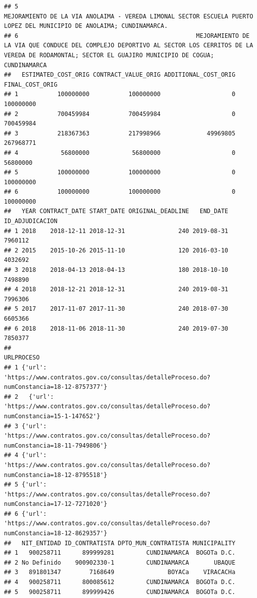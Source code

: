\documentclass[
]{article}
\begin{document}
\begin{verbatim}
## 5                                                                                            MEJORAMIENTO DE LA VIA ANOLAIMA - VEREDA LIMONAL SECTOR ESCUELA PUERTO LOPEZ DEL MUNICIPIO DE ANOLAIMA; CUNDINAMARCA.
## 6                                                  MEJORAMIENTO DE LA VIA QUE CONDUCE DEL COMPLEJO DEPORTIVO AL SECTOR LOS CERRITOS DE LA VEREDA DE RODAMONTAL; SECTOR EL GUAJIRO MUNICIPIO DE COGUA; CUNDINAMARCA
##   ESTIMATED_COST_ORIG CONTRACT_VALUE_ORIG ADDITIONAL_COST_ORIG FINAL_COST_ORIG
## 1           100000000           100000000                    0       100000000
## 2           700459984           700459984                    0       700459984
## 3           218367363           217998966             49969805       267968771
## 4            56800000            56800000                    0        56800000
## 5           100000000           100000000                    0       100000000
## 6           100000000           100000000                    0       100000000
##   YEAR CONTRACT_DATE START_DATE ORIGINAL_DEADLINE   END_DATE ID_ADJUDICACION
## 1 2018    2018-12-11 2018-12-31               240 2019-08-31         7960112
## 2 2015    2015-10-26 2015-11-10               120 2016-03-10         4032692
## 3 2018    2018-04-13 2018-04-13               180 2018-10-10         7498890
## 4 2018    2018-12-21 2018-12-31               240 2019-08-31         7996306
## 5 2017    2017-11-07 2017-11-30               240 2018-07-30         6605366
## 6 2018    2018-11-06 2018-11-30               240 2019-07-30         7850377
##                                                                                        URLPROCESO
## 1 {'url': 'https://www.contratos.gov.co/consultas/detalleProceso.do?numConstancia=18-12-8757377'}
## 2   {'url': 'https://www.contratos.gov.co/consultas/detalleProceso.do?numConstancia=15-1-147652'}
## 3 {'url': 'https://www.contratos.gov.co/consultas/detalleProceso.do?numConstancia=18-11-7949806'}
## 4 {'url': 'https://www.contratos.gov.co/consultas/detalleProceso.do?numConstancia=18-12-8795518'}
## 5 {'url': 'https://www.contratos.gov.co/consultas/detalleProceso.do?numConstancia=17-12-7271020'}
## 6 {'url': 'https://www.contratos.gov.co/consultas/detalleProceso.do?numConstancia=18-12-8629357'}
##   NIT_ENTIDAD ID_CONTRATISTA DPTO_MUN_CONTRATISTA MUNICIPALITY
## 1   900258711      899999281         CUNDINAMARCA  BOGOTa D.C.
## 2 No Definido    900902330-1         CUNDINAMARCA       UBAQUE
## 3   891801347        7168649               BOYACa    VIRACACHa
## 4   900258711      800085612         CUNDINAMARCA  BOGOTa D.C.
## 5   900258711      899999426         CUNDINAMARCA  BOGOTa D.C.

\end{verbatim}
\end{document}
